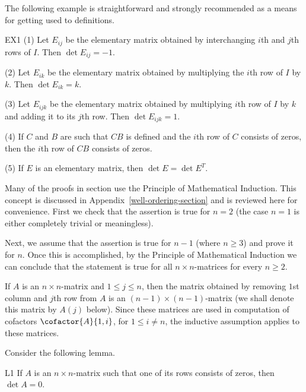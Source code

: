 The following example is straightforward and strongly recommended as a
means for getting used to definitions.

\begin{example}{}{EX1}
  (1) Let $E_{ij}$ be the elementary matrix obtained by interchanging
  $i$th and $j$th rows of $I$.  Then $\det E_{ij}=-1$.

  (2) Let $E_{ik}$ be the elementary matrix obtained by multiplying
  the $i$th row of $I$ by $k$.  Then $\det E_{ik}=k$.

  (3) Let $E_{ijk}$ be the elementary matrix obtained by multiplying
  $i$th row of $I$ by $k$ and adding it to its $j$th row. Then
  $\det E_{ijk}=1$.

  (4) If $C$ and $B$ are such that $CB$ is defined and the $i$th row
  of $C$ consists of zeros, then the $i$th row of $CB$ consists of
  zeros.

  (5) If $E$ is an elementary matrix, then $\det E=\det E^T$.
\end{example}

Many of the proofs in section use the Principle of Mathematical
Induction. This concept is discussed in
Appendix~\ref{well-ordering-section} and is reviewed here for
convenience.  First we check that the assertion is true for $n=2$ (the
case $n=1$ is either completely trivial or meaningless).

Next, we assume that the assertion is true for $n-1$ (where $n\geq 3$)
and prove it for $n$.  Once this is accomplished, by the Principle of
Mathematical Induction we can conclude that the statement is true for
all $n\times n$-matrices for every $n\geq 2$.

If $A$ is an $n\times n$-matrix and $1\leq j \leq n$, then the matrix
obtained by removing $1$st column and $j$th row from $A$ is an
$(n-1)\times (n-1)$-matrix (we shall denote this matrix by $A(j)$
below). Since these matrices are used in computation of cofactors
$\cofactor{A}{1,i}$, for $1\leq i\neq n$, the inductive assumption applies
to these matrices.

Consider the following lemma.

\begin{lemma}{}{L1}
  If $A$ is an $n\times n$-matrix such that one of its rows consists
  of zeros, then $\det A=0$.
\end{lemma}

